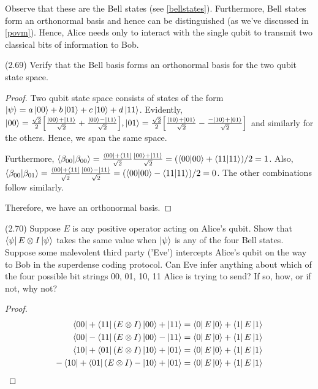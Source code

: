 \documentclass[main.tex]{subfiles}
\begin{document}
\begin{subappendices}
Observe that these are the Bell states (see \ref{bellstates}). Furthermore, Bell states form an orthonormal basis and hence can be distinguished (as we've discussed in \ref{povm}). Hence, Alice needs only to interact with the single qubit to transmit two classical bits of information to Bob.

\begin{exercise} 
(2.69) Verify that the Bell basis forms an orthonormal basis for the two qubit state space.

\begin{proof}
Two qubit state space consists of states of the form $\ket{\psi} = a\ket{00} + b\ket{01} + c \ket{10} + d\ket{11}$. Evidently, $\ket{00} = \frac{\sqrt{2}}{2}\Big[\frac{\ket{00} + \ket{11}}{\sqrt{2}} + \frac{\ket{00} - \ket{11}}{\sqrt{2}}\Big], \ket{01} = \frac{\sqrt{2}}{2}\Big[\frac{\ket{10} + \ket{01}}{\sqrt{2}} - \frac{-\ket{10} + \ket{01}}{\sqrt{2}}\Big]$ and similarly for the others. Hence, we span the same space.

Furthermore,  $\bra{\beta_{00}}\ket{\beta_{00}} = \frac{\bra{00} + \bra{11}}{\sqrt{2}}\frac{\ket{00} + \ket{11}}{\sqrt{2}} = (\bra{00}\ket{00} + \bra{11}\ket{11}) /2 = 1$. Also, $\bra{\beta_{00}}\ket{\beta_{01}} = \frac{\bra{00} + \bra{11}}{\sqrt{2}}\frac{\ket{00} - \ket{11}}{\sqrt{2}} = (\bra{00}\ket{00} - \bra{11}\ket{11})/2 = 0$. The other combinations follow similarly.

Therefore, we have an orthonormal basis. 
\end{proof}

\end{exercise}

\begin{exercise} 
(2.70) Suppose $E$ is any positive operator acting on Alice’s qubit. Show that $\bra{\psi} E \otimes I \ket{\psi}$ takes the same value when $\ket{\psi}$ is any of the four Bell states. Suppose some malevolent third party ('Eve') intercepts Alice’s qubit on the way to Bob in the superdense coding protocol. Can Eve infer anything about which of the four possible bit strings 00, 01, 10, 11 Alice is trying to send? If so, how, or if not, why not?	
\end{exercise}

\begin{proof}
\begin{align*}
	\bra{00} + \bra{11} (E \otimes I) \ket{00} + \ket{11} &= \bra{0}E\ket{0} + \bra{1}E\ket{1}\\
 	\bra{00} - \bra{11}(E \otimes I)\ket{00} - \ket{11}&= \bra{0}E\ket{0} + \bra{1}E\ket{1}\\
 	\bra{10} + \bra{01} (E \otimes I)\ket{10} + \ket{01} &= \bra{0}E\ket{0} + \bra{1}E\ket{1}\\
 	-\bra{10} + \bra{01}(E \otimes I)-\ket{10} + \ket{01} &= \bra{0}E\ket{0} + \bra{1}E\ket{1}\\
\end{align*}
	

\end{proof}
\end{subappendices}
\end{document}
